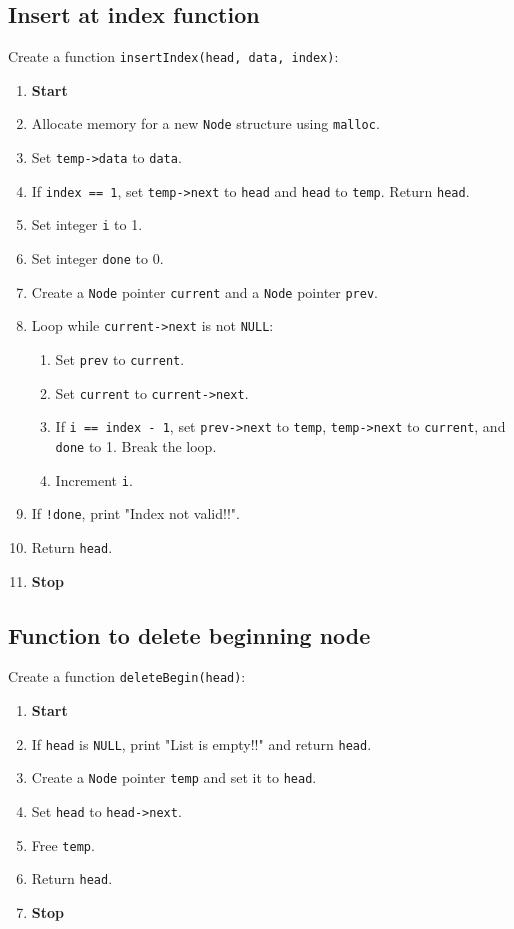 {  \subsection{Insert at index function}
  Create a function \texttt{insertIndex(head, data, index)}:
  \begin{enumerate}[label=\arabic*:,left=0pt]
    \item \textbf{Start}
    \item Allocate memory for a new \texttt{Node} structure using \texttt{malloc}.
    \item Set \texttt{temp->data} to \texttt{data}.
    \item If \texttt{index == 1}, set \texttt{temp->next} to \texttt{head} and \texttt{head} to \texttt{temp}. Return \texttt{head}.
    \item Set integer \texttt{i} to 1.
    \item Set integer \texttt{done} to 0.
    \item Create a \texttt{Node} pointer \texttt{current} and a \texttt{Node} pointer \texttt{prev}.
    \item Loop while \texttt{current->next} is not \texttt{NULL}:
          \begin{enumerate}[label=2.\arabic*:, start=1]
            \item Set \texttt{prev} to \texttt{current}.
            \item Set \texttt{current} to \texttt{current->next}.
            \item If \texttt{i == index - 1}, set \texttt{prev->next} to \texttt{temp}, \texttt{temp->next} to \texttt{current}, and \texttt{done} to 1. \newline Break the loop.
            \item Increment \texttt{i}.
          \end{enumerate}
    \item If \texttt{!done}, print "Index not valid!!".
    \item Return \texttt{head}.
    \item \textbf{Stop}
  \end{enumerate}

  \subsection{Function to delete beginning node}
  Create a function \texttt{deleteBegin(head)}:
  \begin{enumerate}[label=\arabic*:,left=0pt]
    \item \textbf{Start}
    \item If \texttt{head} is \texttt{NULL}, print "List is empty!!" and return \texttt{head}.
    \item Create a \texttt{Node} pointer \texttt{temp} and set it to \texttt{head}.
    \item Set \texttt{head} to \texttt{head->next}.
    \item Free \texttt{temp}.
    \item Return \texttt{head}.
    \item \textbf{Stop}
  \end{enumerate}

}
